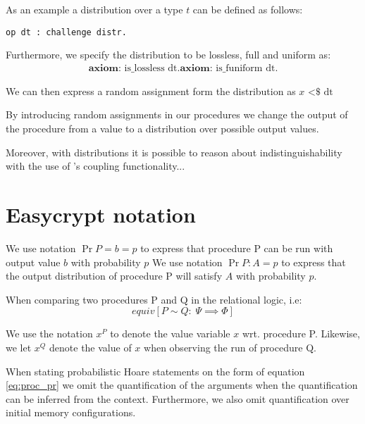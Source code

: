 As an example a distribution over a type $t$ can be defined as follows:
\begin{lstlisting}[frame=none]
op dt : challenge distr.
\end{lstlisting}
Furthermore, we specify the distribution to be lossless, full and uniform as:
\begin{gather*}
  \textbf{axiom: } \text{is\_lossless dt}.
  \textbf{axiom: } \text{is\_funiform dt}.
\end{gather*}

We can then express a random assignment form the distribution as $x \text{ <\$} \text{ dt}$


By introducing random assignments in our procedures we change
the output of the procedure from a value to a distribution over possible output values.

Moreover, with distributions it is possible to reason about indistinguishability
with the use of \easycrypt's coupling functionality...

\section{Easycrypt notation}
\label{sec:label}

We use notation $\Pr{P = b} = p$ to express that procedure P can be run with
output value $b$ with probability $p$
We use notation $\Pr{P : A} = p$ to express that the output distribution of
procedure P will satisfy $A$ with probability $p$.

When comparing two procedures P and Q in the relational logic, i.e:
\[
  equiv[P \sim Q :\; \Psi \implies \Phi]
\]

We use the notation $x^{P}$ to denote the value variable $x$ wrt. procedure P.
Likewise, we let $x^{Q}$ denote the value of $x$ when observing the run of
procedure Q.

When stating probabilistic Hoare statements on the form of equation
\ref{eq:proc_pr} we omit the quantification of the arguments when the
quantification can be inferred from the context. Furthermore, we also omit
quantification over initial memory configurations.

